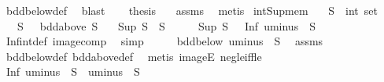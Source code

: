 \begin{isabellebody}
\ bdd{\isacharunderscore}{\kern0pt}below{\isacharunderscore}{\kern0pt}def\ \isamarkupfalse%
\ blast\isanewline
\ \ \isamarkupfalse%
\ {\isacharquery}{\kern0pt}thesis\ \isamarkupfalse%
\ {\isacharasterisk}{\kern0pt}{\isacharasterisk}{\kern0pt}\ assms\ \isamarkupfalse%
\ metis\isanewline
{}\isamarkupfalse%
%
\endisatagproof
{\isafoldproof}%
%
\isadelimproof
\isanewline
%
\endisadelimproof
\isanewline
{}\isamarkupfalse%
\ int{\isacharunderscore}{\kern0pt}Sup{\isacharunderscore}{\kern0pt}mem{\isacharcolon}{\kern0pt}\isanewline
\ \ \ S\ {\isacharcolon}{\kern0pt}{\isacharcolon}{\kern0pt}\ {\isachardoublequoteopen}int\ set{\isachardoublequoteclose}\isanewline
\ \ \ {\isachardoublequoteopen}S\ {\isasymnoteq}\ {\isacharbraceleft}{\kern0pt}{\isacharbraceright}{\kern0pt}{\isachardoublequoteclose}\ {\isachardoublequoteopen}bdd{\isacharunderscore}{\kern0pt}above\ S{\isachardoublequoteclose}\isanewline
\ \ \ {\isachardoublequoteopen}Sup\ S\ {\isasymin}\ S{\isachardoublequoteclose}\isanewline
%
\isadelimproof
%
\endisadelimproof
%
\isatagproof
{}\isamarkupfalse%
\ {\isacharminus}{\kern0pt}\isanewline
\ \ \isamarkupfalse%
\ {\isachardoublequoteopen}Sup\ S\ {\isacharequal}{\kern0pt}\ {\isacharparenleft}{\kern0pt}{\isacharminus}{\kern0pt}\ Inf\ {\isacharparenleft}{\kern0pt}uminus\ {\isacharbackquote}{\kern0pt}\ S{\isacharparenright}{\kern0pt}{\isacharparenright}{\kern0pt}{\isachardoublequoteclose}\ \isamarkupfalse%
\ Inf{\isacharunderscore}{\kern0pt}int{\isacharunderscore}{\kern0pt}def\ image{\isacharunderscore}{\kern0pt}comp\ \isamarkupfalse%
\ simp\isanewline
\ \ \isamarkupfalse%
\ \isamarkupfalse%
\ {\isachardoublequoteopen}bdd{\isacharunderscore}{\kern0pt}below\ {\isacharparenleft}{\kern0pt}uminus\ {\isacharbackquote}{\kern0pt}\ S{\isacharparenright}{\kern0pt}{\isachardoublequoteclose}\ \isamarkupfalse%
\ assms\ \isamarkupfalse%
\ bdd{\isacharunderscore}{\kern0pt}below{\isacharunderscore}{\kern0pt}def\ bdd{\isacharunderscore}{\kern0pt}above{\isacharunderscore}{\kern0pt}def\ \isamarkupfalse%
\ {\isacharparenleft}{\kern0pt}metis\ imageE\ neg{\isacharunderscore}{\kern0pt}le{\isacharunderscore}{\kern0pt}iff{\isacharunderscore}{\kern0pt}le{\isacharparenright}{\kern0pt}\isanewline
\ \ \isamarkupfalse%
\ \isamarkupfalse%
\ {\isachardoublequoteopen}Inf\ {\isacharparenleft}{\kern0pt}uminus\ {\isacharbackquote}{\kern0pt}\ S{\isacharparenright}{\kern0pt}\ {\isasymin}\ {\isacharparenleft}{\kern0pt}uminus\ {\isacharbackquote}{\kern0pt}\ S{\isacharparenright}{\kern0pt}{\isachardoublequoteclose}\ \isamarkupfalse%

\end{isabellebody}
